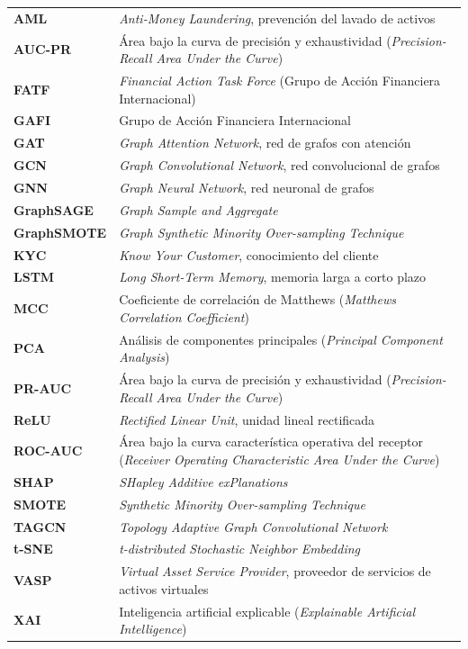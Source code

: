 \documentclass[a4paper,oneside,12pt]{book}
\begin{document}
\begin{longtable}{p{}p{}}
\textbf{AML} & \textit{Anti-Money Laundering}, prevención del lavado de activos \\[2pt]
\textbf{AUC-PR} & Área bajo la curva de precisión y exhaustividad (\textit{Precision-Recall Area Under the Curve}) \\[2pt]
\textbf{FATF} & \textit{Financial Action Task Force} (Grupo de Acción Financiera Internacional) \\[2pt]
\textbf{GAFI} & Grupo de Acción Financiera Internacional \\[2pt]
\textbf{GAT} & \textit{Graph Attention Network}, red de grafos con atención \\[2pt]
\textbf{GCN} & \textit{Graph Convolutional Network}, red convolucional de grafos \\[2pt]
\textbf{GNN} & \textit{Graph Neural Network}, red neuronal de grafos \\[2pt]
\textbf{GraphSAGE} & \textit{Graph Sample and Aggregate} \\[2pt]
\textbf{GraphSMOTE} & \textit{Graph Synthetic Minority Over-sampling Technique} \\[2pt]
\textbf{KYC} & \textit{Know Your Customer}, conocimiento del cliente \\[2pt]
\textbf{LSTM} & \textit{Long Short-Term Memory}, memoria larga a corto plazo \\[2pt]
\textbf{MCC} & Coeficiente de correlación de Matthews (\textit{Matthews Correlation Coefficient}) \\[2pt]
\textbf{PCA} & Análisis de componentes principales (\textit{Principal Component Analysis}) \\[2pt]
\textbf{PR-AUC} & Área bajo la curva de precisión y exhaustividad (\textit{Precision-Recall Area Under the Curve}) \\[2pt]
\textbf{ReLU} & \textit{Rectified Linear Unit}, unidad lineal rectificada \\[2pt]
\textbf{ROC-AUC} & Área bajo la curva característica operativa del receptor (\textit{Receiver Operating Characteristic Area Under the Curve}) \\[2pt]
\textbf{SHAP} & \textit{SHapley Additive exPlanations} \\[2pt]
\textbf{SMOTE} & \textit{Synthetic Minority Over-sampling Technique} \\[2pt]
\textbf{TAGCN} & \textit{Topology Adaptive Graph Convolutional Network} \\[2pt]
\textbf{t-SNE} & \textit{t-distributed Stochastic Neighbor Embedding} \\[2pt]
\textbf{VASP} & \textit{Virtual Asset Service Provider}, proveedor de servicios de activos virtuales \\[2pt]
\textbf{XAI} & Inteligencia artificial explicable (\textit{Explainable Artificial Intelligence}) \\[2pt]
\end{longtable}
\end{document}
